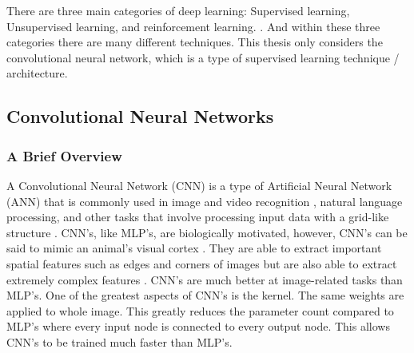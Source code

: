  There are three main categories of deep learning: Supervised learning, Unsupervised learning, and reinforcement learning. \cite{alzubaidi2021review}. And within these three categories there are many different techniques. This thesis only considers the convolutional neural network, which is a type of supervised learning technique / architecture. 

	
\subsection{Convolutional Neural Networks}
\subsubsection*{A Brief Overview}
A Convolutional Neural Network (CNN) is a type of Artificial Neural Network (ANN) that is commonly used in image and video recognition , natural language processing, and other tasks that involve processing input data with a grid-like structure \cite{li2021survey}. CNN's, like MLP's, are biologically motivated, however, CNN's can be said to mimic an animal's visual cortex \cite{angermueller2016deep}. They are  able to extract important spatial features such as edges and corners of images but are also able to extract extremely complex features \cite{KATTENBORN202124}. CNN's are much better at image-related tasks than MLP's. One of the greatest aspects of CNN's is the kernel. The same weights are applied to whole image. This greatly reduces the parameter count compared to MLP's where every input node is connected to every output node. This allows CNN's to be trained much faster than MLP's.

